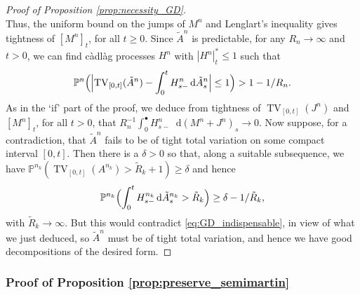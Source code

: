 \documentclass[11pt]{article}
\theoremstyle{definition}\newtheorem{example}[theorem]{Example}
\theoremstyle{definition}\newtheorem{counterexample}[theorem]{Counterexample}
\theoremstyle{definition}\newtheorem{remark}[theorem]{Remark}
\theoremstyle{definition}\newtheorem{defi}[theorem]{Definition}
\numberwithin{equation}{section}
\newcommand*\diff{\mathop{}\!\mathrm{d}}								%
\newcommand{\Pro}{\mathbb{P}}										%
\renewcommand{\|}{\; : \, \;}											%
\begin{document}
\begin{proof}[Proof of Proposition \ref{prop:necessity_GD}]
\[	\]
	Thus, the uniform bound on the jumps of $M^n$ and Lenglart's inequality \cite[Lem.~I.3.30]{shiryaev} gives tightness of $[M^n]_t$, for all $t\geq 0$. Since $\tilde{A}^n$ is predictable, for any $R_n\rightarrow \infty $ and $t>0$,  we can find c\`adl\`ag processes $H^{n}$ with $|H^{n}|_t^*\le 1$ such that
	\[\Pro^{n}\Bigl( \Bigl| \operatorname{TV}_{[0,t]}(\tilde{A}^{n}) - \int_0^t H^{n}_{s-} \diff \tilde{A}^{n}_s\Bigr| \le 1\Bigr)> 1-1/R_n.
	\]
	As in the `if' part of the proof, we deduce from tightness of $\operatorname{TV}_{[0,t]}(J^n)$ and $[M^n]_t$, for all $t>0$, that $R_n^{-1}\int_0^\bullet H^n_{s-} \diff (M^n +J^{n})_s \rightarrow 0$. Now suppose, for a contradiction, that $\tilde{A}^n$ fails to be of tight total variation on some compact interval $[0,t]$. Then there is a $\delta >0$ so that, along a suitable subsequence, we have $\Pro^{n_k}(\operatorname{TV}_{[0,t]}(A^{n_k})> \tilde{R}_{k} +1 ) \geq \delta$ and hence
	\[
	\Pro^{n_k}\Bigl(\int_0^t H^{n_k}_{s-} \diff \tilde{A}^{n_k}_s > \tilde{R}_{k} \Bigr) \geq  \delta - 1/\tilde{R}_k,
	\]
	with $\tilde{R}_k \rightarrow \infty$. But this would contradict \eqref{eq:GD_indispensable}, in view of what we just deduced, so $\tilde{A}^n$ must be of tight total variation, and hence we have good decompositions of the desired form.
\end{proof}




\subsubsection{Proof of Proposition \ref{prop:preserve_semimartin}}
\label{subsec:Proof_Semimart_Prop}
\end{document}
